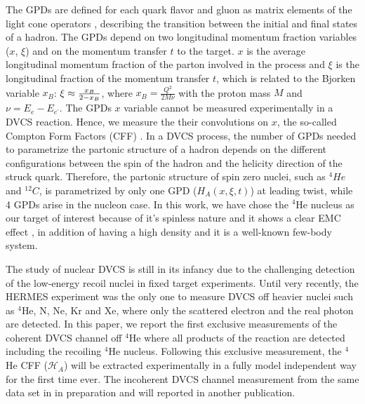 \documentclass[nofootinbib,twocolumn,showpacs,prl,superscriptaddress,secnumarabic,amssymb,nobibnotes,aps,floatfix]{revtex4}
\begin{document}
The GPDs are defined for each quark flavor and gluon as matrix
elements of the light cone operators \cite{Belitsky}, describing the transition 
between the initial and final states of a hadron. The GPDs depend on two 
longitudinal momentum fraction variables ($x$, $\xi$) and on the momentum 
transfer $t$ to the target. $x$ is the average longitudinal momentum fraction 
of the parton involved in the process and $\xi$ is the longitudinal fraction of 
the momentum transfer $t$, which is related to the Bjorken variable $x_{B}$: 
$\xi\approx {{x_B}\over{2-x_B}}$, where $x_B=\frac{Q^2}{2M\nu}$ with
the proton mass $M$ and $\nu=E_e-E_{e^\prime}$. The GPDs $x$ variable cannot be 
measured experimentally in a DVCS reaction. Hence, we measure the their 
convolutions on $x$, the so-called Compton Form Factors (CFF) 
\cite{Guidal:2013rya}.  In a DVCS process, the number of GPDs needed to 
parametrize the partonic structure of a hadron depends on the different 
configurations between the spin of the hadron and the helicity direction of the 
struck quark.  Therefore, the partonic structure of spin zero nuclei, such as 
$^4He$ and $^{12}C$, is parametrized by only one GPD ($H_{A}(x,\xi,t)$) at 
leading twist, while 4 GPDs arise in the nucleon case.  In this work, we have 
chose the $^4$He nucleus as our target of interest because of it's spinless 
nature and it shows a clear EMC effect \cite{JSeely}, in addition of having a 
high density and it is a well-known few-body system.

The study of nuclear DVCS is still in its infancy due to the challenging 
detection of the low-energy recoil nuclei in fixed target experiments. Until 
very recently, the HERMES experiment \cite{Ellinghaus:2002zw} was the only one 
to measure DVCS off heavier nuclei such as $^4$He, N, Ne, Kr and Xe, where only 
the scattered electron and the real photon are detected. In this paper, we 
report the first exclusive measurements of the coherent DVCS channel off $^4$He 
where all products of the reaction are detected including the recoiling $^4$He 
nucleus. Following this exclusive measurement, the $^4$He CFF 
($\mathcal{H}_{A}$) will be extracted experimentally in a fully model 
independent way for the first time ever. The incoherent DVCS channel 
measurement from the same data set in in preparation and will reported in 
another publication. 
\end{document}
